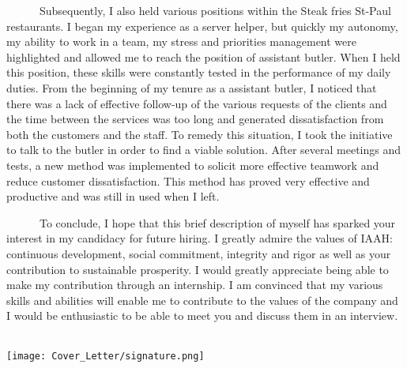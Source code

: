 \documentclass{article}
\begin{document}
\begin{textblock}{11.35}
	\ \ \ \ \ \ Subsequently, I also held various positions within the Steak fries St-Paul restaurants. I began my experience as a server helper, but quickly my autonomy, my ability to work in a team, my stress and priorities management were highlighted and allowed me to reach the position of assistant butler. When I held this position, these skills were constantly tested in the performance of my daily duties. From the beginning of my tenure as a assistant butler, I noticed that there was a lack of effective follow-up of the various requests of the clients and the time between the services was too long and generated dissatisfaction from both the customers and the staff. To remedy this situation, I took the initiative to talk to the butler in order to find a viable solution. After several meetings and tests, a new method was implemented to solicit more effective teamwork and reduce customer dissatisfaction. This method has proved very effective and productive and was still in used when I left.
\bigskip
	

	\ \ \ \ \ \ To conclude, I hope that this brief description of myself has sparked your interest in my candidacy for future hiring. I greatly admire the values of IAAH: continuous development, social commitment, integrity and rigor as well as your contribution to sustainable prosperity. I would greatly appreciate being able to make my contribution through an internship. I am convinced that my various skills and abilities will enable me to contribute to the values of the company and I would be enthusiastic to be able to meet you and discuss them in an interview.
\bigskip

\textcolor{black}{} \\

\texttt{[image: Cover\_Letter/signature.png]}


\end{textblock}
\end{document}
